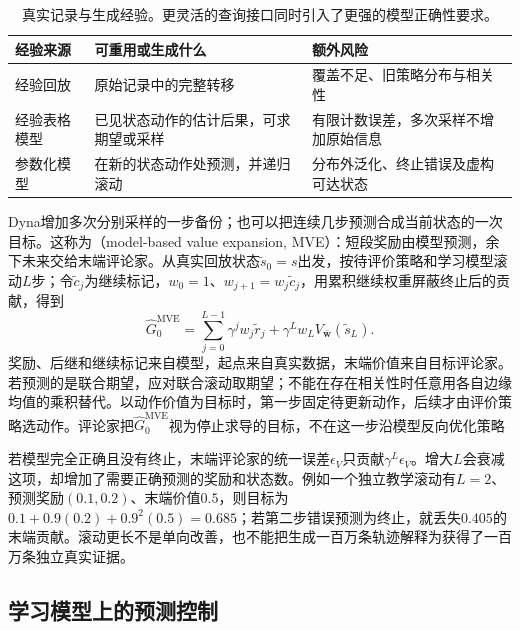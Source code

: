 \begin{table}[htbp]
  \centering
  \small
  \begin{tabularx}{\linewidth}{>{\raggedright\arraybackslash}p{21mm} >{\raggedright\arraybackslash}X >{\raggedright\arraybackslash}X}
    \toprule
    经验来源 & 可重用或生成什么 & 额外风险 \\
    \midrule
    经验回放 & 原始记录中的完整转移 & 覆盖不足、旧策略分布与相关性 \\
    经验表格模型 & 已见状态动作的估计后果，可求期望或采样 & 有限计数误差，多次采样不增加原始信息 \\
    参数化模型 & 在新的状态动作处预测，并递归滚动 & 分布外泛化、终止错误及虚构可达状态 \\
    \bottomrule
  \end{tabularx}
  \caption{真实记录与生成经验。更灵活的查询接口同时引入了更强的模型正确性要求。}
  \label{tab:rl-learning-generated-experience}
\end{table}

Dyna增加多次分别采样的一步备份；也可以把连续几步预测合成当前状态的一次目标。这称为（model-based value expansion, MVE）：短段奖励由模型预测，余下未来交给末端评论家。从真实回放状态$\widetilde s_0=s$出发，按待评价策略和学习模型滚动$L$步；令$\widetilde c_j$为继续标记，$w_0=1$、$w_{j+1}=w_j\widetilde c_j$，用累积继续权重屏蔽终止后的贡献，得到
\begin{equation}
  \widehat G^{\mathrm{MVE}}_0
  =\sum_{j=0}^{L-1}\gamma^j w_j\widetilde r_j
    +\gamma^L w_L V_{\bar{\bm w}}(\widetilde s_L).
  \label{eq:rl-learning-mve}
\end{equation}
奖励、后继和继续标记来自模型，起点来自真实数据，末端价值来自目标评论家。若预测的是联合期望，应对联合滚动取期望；不能在存在相关性时任意用各自边缘均值的乘积替代。以动作价值为目标时，第一步固定待更新动作，后续才由评价策略选动作。评论家把$\widehat G^{\mathrm{MVE}}_0$视为停止求导的目标，不在这一步沿模型反向优化策略

若模型完全正确且没有终止，末端评论家的统一误差$\epsilon_V$只贡献$\gamma^L\epsilon_V$。增大$L$会衰减这项，却增加了需要正确预测的奖励和状态数。例如一个独立教学滚动有$L=2$、预测奖励$(0.1,0.2)$、末端价值$0.5$，则目标为$0.1+0.9(0.2)+0.9^2(0.5)=0.685$；若第二步错误预测为终止，就丢失$0.405$的末端贡献。滚动更长不是单向改善，也不能把生成一百万条轨迹解释为获得了一百万条独立真实证据。

\subsection{学习模型上的预测控制}
\label{sec:rl-learning-learned-mpc}

